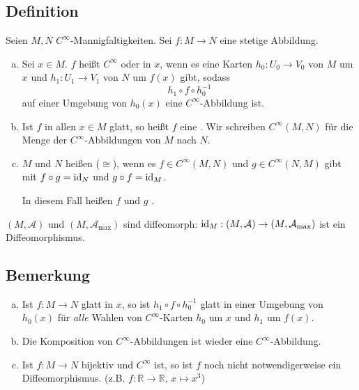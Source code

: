 \subsection[Definition: Differenzierbarkeit einer Abbildung $f : M \to N$]{Definition} %
\label{sub:156}
Seien $M,N$ $C^\infty$-Mannigfaltigkeiten. Sei $f : M \to N$ eine stetige Abbildung.
\begin{enumerate}[a)]
	\item Sei $x \in M$. $f$ heißt $C^\infty$ oder  in $x$, wenn es eine Karten $h_0 : U_0 \to V_0$ von $M$ um $x$ und 
	$h_1 : U_1 \to V_1$ von $N$ um $f(x)$ gibt, sodass 
	\[
		h_1 \circ f \circ h_0 ^{-1}
	\]
	auf einer Umgebung von $h_0(x)$ eine $C^\infty$-Abbildung ist.
	\item Ist $f$ in allen $x \in M$ glatt, so heißt $f$ eine . Wir schreiben $C^\infty(M,N)$ für die Menge
	der $C^\infty$-Abbildungen von $M$ nach $N$.
	\item $M$ und $N$ heißen  ($\cong$), wenn es $f \in C^\infty(M,N)$ und $g \in C^\infty(N,M)$ 
	gibt mit $f \circ g = \operatorname{id}_N$ und $g \circ f = \operatorname{id}_M$. 
	
	In diesem Fall heißen $f$ und $g$ . 
\end{enumerate}
$(M,\mathcal{A})$ und $(M, \mathcal{A}_\mathrm{max})$ sind diffeomorph: $\operatorname{id}_M : (M,\mathcal{A}) \to (M, \mathcal{A}_\mathrm{max})$ ist ein Diffeomorphismus.

\subsection[Bemerkungen zur Definition von $C^\infty$]{Bemerkung} %
\label{sub:157}
\begin{enumerate}[a)]
	\item Ist $f : M \to N$ glatt in $x$, so ist $h_1 \circ f \circ h_0 ^{-1}$ glatt in einer Umgebung von $h_0(x)$ für \emph{alle} Wahlen von $C^\infty$-Karten
	$h_0$ um $x$ und $h_1$ um $f(x)$.
	\item Die Komposition von $C^\infty$-Abbildungen ist wieder eine $C^\infty$-Abbildung.
	\item Ist $f : M \to N$ bijektiv und $C^\infty$ ist, so ist $f$ noch nicht notwendigerweise ein Diffeomorphismus. (z.B. $f : \mathds{R} \to \mathds{R}$, $x \mapsto x^3$)
\end{enumerate}

